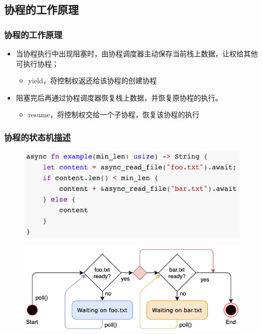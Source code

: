 \subsection{协程的工作原理}
% 
\begin{frame}[fragile]
    \frametitle{协程的工作原理}
% 
    \begin{itemize}
        \item 当协程执行中出现阻塞时，由协程调度器主动保存当前栈上数据，让权给其他可执行协程； \pause
    \begin{itemize}
        \item yield，将控制权返还给该协程的创建协程
    \end{itemize}
        \item 阻塞完后再通过协程调度器恢复栈上数据，并恢复原协程的执行。 \pause
    \begin{itemize}
        \item resume，将控制权交给一个子协程，恢复该协程的执行
    \end{itemize}

% 
    \end{itemize}
\end{frame}
\begin{frame}[fragile]
    \frametitle{协程的状态机\href{https://os.phil-opp.com/async-await/\#the-async-await-pattern}{描述}}
% 
	\begin{figure}
		\centering
		\includegraphics[width=0.5\linewidth]{figs/Rust-fsm.png}
	\end{figure}

\pause
% 
	\begin{figure}
		\centering
		\includegraphics[width=0.6\linewidth]{figs/async-state-machine-basic.png}
    \end{figure}


% 
% 
% 

\end{frame}
